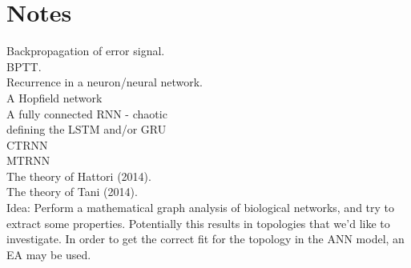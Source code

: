 \section{Notes}
Backpropagation of error signal.
\\
BPTT.
\\
Recurrence in a neuron/neural network.
\\
A Hopfield network
\\
A fully connected RNN - chaotic
\\
defining the LSTM and/or GRU
\\
CTRNN
\\
MTRNN
\\
The theory of Hattori (2014).
\\
The theory of Tani (2014).
\\
Idea: Perform a mathematical graph analysis of biological networks, and try to extract some properties. Potentially this results in topologies that we'd like to investigate. In order to get the correct fit for the topology in the ANN model, an EA may be used.


\cleardoublepage